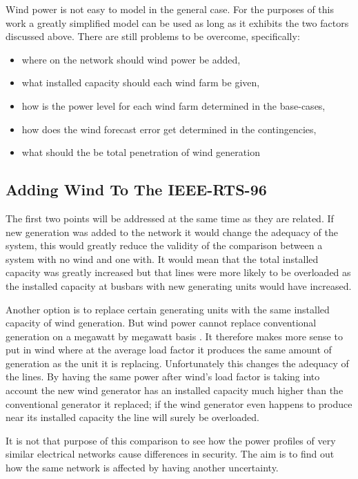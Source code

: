\documentclass[a4paper,oneside,12pt]{report}
\begin{document}
Wind power is not easy to model in the general case. For the purposes of this work a greatly simplified model can be used as long as it exhibits the two factors discussed above. There are still problems to be overcome, specifically: 

\begin{itemize}
\item where on the network should wind power be added, 
\item what installed capacity should each wind farm be given, 
\item how is the power level for each wind farm determined in the base-cases,
\item how does the wind forecast error get determined in the contingencies,
\item what should the be total penetration of wind generation
\end{itemize}

\subsection{Adding Wind To The IEEE-RTS-96}

The first two points will be addressed at the same time as they are related. If new generation was added to the network it would change the adequacy of the system, this would greatly reduce the validity of the comparison between a system with no wind and one with. It would mean that the total installed capacity was greatly increased but that lines were more likely to be overloaded as the installed capacity at busbars with new generating units would have increased. 

Another option is to replace certain generating units with the same installed capacity of wind generation. But wind power cannot replace conventional generation on a megawatt by megawatt basis \cite{Strbac2007}. It therefore makes more sense to put in wind where at the average load factor it produces the same amount of generation as the unit it is replacing. Unfortunately this changes the adequacy of the lines. By having the same power after wind's load factor is taking into account the new wind generator has an installed capacity much higher than the conventional generator it replaced; if the wind generator even happens to produce near its installed capacity the line will surely be overloaded. 

It is not that purpose of this comparison to see how the power profiles of very similar electrical networks cause differences in security. The aim is to find out how the same network is affected by having another uncertainty. 
\end{document}
